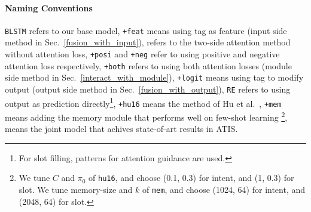 \paragraph{Naming Conventions}
\texttt{BLSTM} refers to our base model,
\texttt{+feat} means using \RE tag as feature (input side method in Sec.~\ref{fusion_with_input}),
\ptatt refers to the two-side attention method without attention loss,
\texttt{+posi} and \texttt{+neg} refer to using positive and negative attention loss respectively, \texttt{+both} refers to using both attention losses (\NN module side method in Sec.~\ref{interact_with_module}),
\texttt{+logit} means using \RE tag to modify \NN output (output side method in Sec.~\ref{fusion_with_output}),
\texttt{RE} refers to using \RE output as prediction directly\footnote{
For slot filling, patterns for attention guidance are used.},
\texttt{+hu16} means the method of Hu et al.~,
\texttt{+mem} means adding the memory module that performs well on few-shot learning \cite{kaiser2017learning}\footnote{
We tune $C$ and $\pi_0$ of \texttt{hu16}, and choose (0.1, 0.3) for intent, and (1, 0.3) for slot. We tune memory-size and $k$ of \texttt{mem}, and choose (1024, 64) for intent, and (2048, 64) for slot.
},
\LL means the joint model \cite{liu2016attention} that achives state-of-art results in ATIS.
